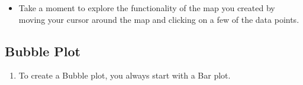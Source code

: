 \documentclass[
]{book}
\providecommand{\tightlist}{%
  \setlength{\itemsep}{0pt}\setlength{\parskip}{0pt}}
\begin{document}
\begin{enumerate}
  \begin{itemize}
  \tightlist
  \item
    Take a moment to explore the functionality of the map you created by moving your cursor around the map and clicking on a few of the data points.
  \end{itemize}
\end{enumerate}

\hypertarget{bubble-plot}{%
\subsection{Bubble Plot}\label{bubble-plot}}

\begin{enumerate}
\def\labelenumi{\arabic{enumi}.}
\tightlist
\item
  To create a Bubble plot, you always start with a Bar plot.


\end{enumerate}
\end{document}
